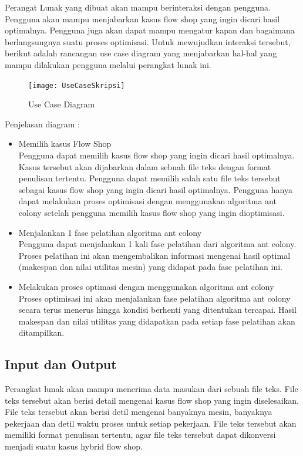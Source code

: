 	Perangat Lunak yang dibuat akan mampu berinteraksi dengan pengguna. Pengguna akan mampu
	menjabarkan kasus flow shop yang ingin dicari hasil optimalnya. Pengguna juga akan dapat
	mampu mengatur kapan dan bagaimana berlangsungnya suatu proses optimisasi. Untuk mewujudkan
	interaksi tersebut, berikut adalah rancangan use case diagram yang menjabarkan hal-hal
	yang mampu dilakukan pengguna melalui perangkat lunak ini.
	\begin{figure}[H]
		\centering
		\texttt{[image: UseCaseSkripsi]}
		\caption[Use Case Diagram]{Use Case Diagram}
		\label{fig:usecasediagram}
	\end{figure}
	Penjelasan diagram :
	\begin{itemize}
		\item Memilih kasus Flow Shop\\
		Pengguna dapat memilih kasus flow shop yang ingin dicari hasil optimalnya. Kasus
		tersebut akan dijabarkan dalam sebuah file teks dengan format penulisan tertentu. Pengguna
		dapat memilih salah satu file teks tersebut sebagai kasus flow shop yang ingin dicari
		hasil optimalnya. Pengguna hanya dapat melakukan proses optimisasi dengan menggunakan
		algoritma ant colony setelah pengguna memilih kasus flow shop yang ingin dioptimisasi.
		\item Menjalankan 1 fase pelatihan algoritma ant colony\\
		Pengguna dapat menjalankan 1 kali fase pelatihan dari algoritma ant colony. Proses pelatihan
		ini akan mengembalikan informasi mengenai hasil optimal (makespan dan nilai utilitas mesin) yang 
		didapat pada fase pelatihan	ini.
		\item Melakukan proses optimasi dengan menggunakan algoritma ant colony\\
		Proses optimisasi ini akan menjalankan fase pelatihan algoritma ant colony secara terus 
		menerus hingga kondisi berhenti yang ditentukan tercapai. Hasil makespan dan nilai utilitas yang
		didapatkan pada setiap fase pelatihan akan ditampilkan.
	\end{itemize}
	
	\subsection{Input dan Output}
	
	Perangkat lunak akan mampu menerima data masukan dari sebuah file teks. File teks tersebut
	akan berisi detail mengenai kasus flow shop yang ingin diselesaikan. File teks tersebut akan
	berisi detil mengenai banyaknya mesin, banyaknya pekerjaan dan detil waktu proses untuk setiap pekerjaan. 
	File teks tersebut akan memiliki format penulisan
	tertentu, agar file teks tersebut dapat dikonversi menjadi suatu kasus hybrid flow shop.
	
